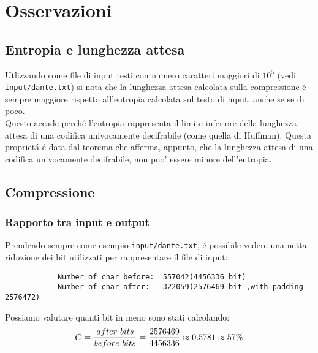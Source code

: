 \documentclass{article}
\begin{document}
\section{Osservazioni}
\subsection{Entropia e lunghezza attesa}
Utlizzando come file di input testi con numero caratteri maggiori di $10^{5}$ (vedi \verb+input/dante.txt+) si nota che la lunghezza attesa calcolata sulla compressione \'e sempre maggiore rispetto all'entropia calcolata sul testo di input, anche se se di poco. \\
Questo accade perch\'e l'entropia rappresenta il limite inferiore della lunghezza attesa di una codifica univocamente decifrabile (come quella di Huffman). Questa propriet\'a \'e data dal teorema che afferma, appunto, che la lunghezza attesa di una codifica univocamente decifrabile, non puo' essere minore dell'entropia.
\newpage
\subsection{Compressione}
\subsubsection{Rapporto tra input e output}
Prendendo sempre come esempio \verb+input/dante.txt+, \'e possibile vedere una netta riduzione dei bit utilizzati per rappresentare il file di input:
\begin{verbatim}
            Number of char before:  557042(4456336 bit)
            Number of char after:   322059(2576469 bit ,with padding 2576472)
\end{verbatim}
Possiamo valutare quanti bit in meno sono stati calcolando: \\
\[ G = \frac{after \  bits}{before \  bits} \\ = \frac{2576469}{4456336} \approx 0.5781 \approx 57\% \]
\end{document}

